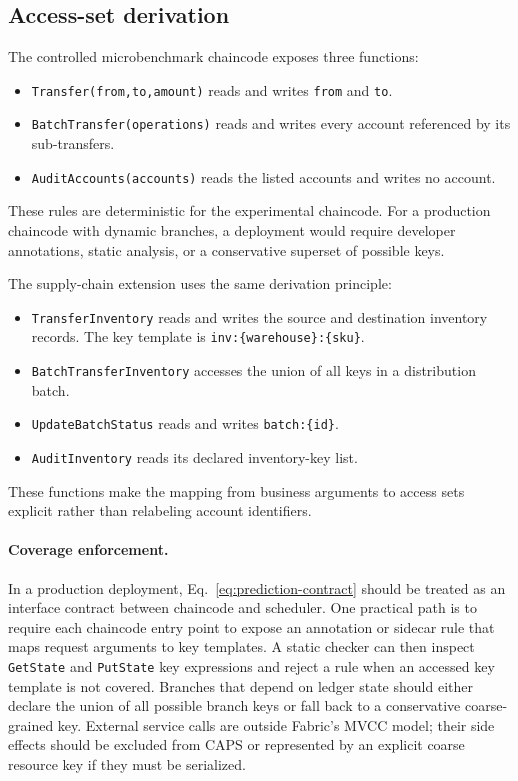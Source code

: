 \documentclass[fleqn,10pt,lineno]{wlpeerj}
\begin{document}
\subsection*{Access-set derivation}

The controlled microbenchmark chaincode exposes three functions:

\begin{itemize}[noitemsep]
  \item \texttt{Transfer(from,to,amount)} reads and writes \texttt{from} and \texttt{to}.
  \item \texttt{BatchTransfer(operations)} reads and writes every account referenced by its sub-transfers.
  \item \texttt{AuditAccounts(accounts)} reads the listed accounts and writes no account.
\end{itemize}

These rules are deterministic for the experimental chaincode. For a production chaincode with dynamic branches, a deployment would require developer annotations, static analysis, or a conservative superset of possible keys.

The supply-chain extension uses the same derivation principle:
\begin{itemize}[leftmargin=*]
  \item \texttt{TransferInventory} reads and writes the source and destination inventory records. The key template is \texttt{inv:\{warehouse\}:\{sku\}}.
  \item \texttt{BatchTransferInventory} accesses the union of all keys in a distribution batch.
  \item \texttt{UpdateBatchStatus} reads and writes \texttt{batch:\{id\}}.
  \item \texttt{AuditInventory} reads its declared inventory-key list.
\end{itemize}
These functions make the mapping from business arguments to access sets explicit rather than relabeling account identifiers.

\paragraph{Coverage enforcement.}
In a production deployment, Eq.~\eqref{eq:prediction-contract} should be treated as an interface contract between chaincode and scheduler. One practical path is to require each chaincode entry point to expose an annotation or sidecar rule that maps request arguments to key templates. A static checker can then inspect \texttt{GetState} and \texttt{PutState} key expressions and reject a rule when an accessed key template is not covered. Branches that depend on ledger state should either declare the union of all possible branch keys or fall back to a conservative coarse-grained key. External service calls are outside Fabric's MVCC model; their side effects should be excluded from CAPS or represented by an explicit coarse resource key if they must be serialized.
\end{document}
